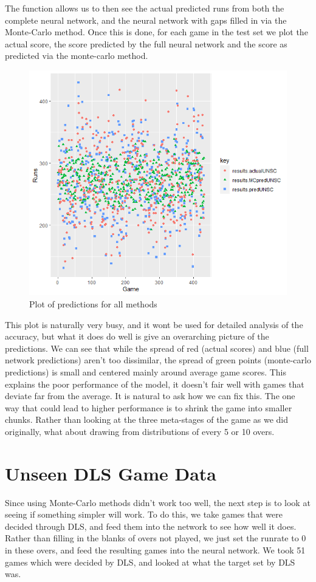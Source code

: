 The function allows us to then see the actual predicted runs from both the complete neural network, and the neural network with 
gaps filled in via the Monte-Carlo method. Once this is done, for each game in the test set we plot the actual score, the score predicted by the full neural network and 
the score as predicted via the monte-carlo method. 

\begin{figure}[h]
    \label{fullPredDist}
    \centering
    \caption{Plot of predictions for all methods}
    \includegraphics[scale=0.6]{figures/fullPredDist.png}
\end{figure}

This plot is naturally very busy, and it wont be used for detailed analysis of the accuracy, but what it does do well is give an overarching picture of the predictions. 
We can see that while the spread of red (actual scores) and blue (full network predictions) aren't too dissimilar, the spread of green points (monte-carlo predictions) is small and centered mainly 
around average game scores. This explains the poor performance of the model, it doesn't fair well with games that deviate far from the average. It is natural to ask how we can fix this. The one way that 
could lead to higher performance is to shrink the game into smaller chunks. Rather than looking at the three meta-stages of the game as we did originally, what about drawing from distributions of every 5 or 10 overs.

\section{Unseen DLS Game Data}
Since using Monte-Carlo methods didn't work too well, the next step is to look at seeing if something simpler will work. To do this, we take games that were decided through DLS, and 
feed them into the network to see how well it does. Rather than filling in the blanks of overs not played, we just set the runrate to 0 in these overs, and feed the resulting games into the neural network. 
We took 51 games which were decided by DLS, and looked at what the target set by DLS was. 

